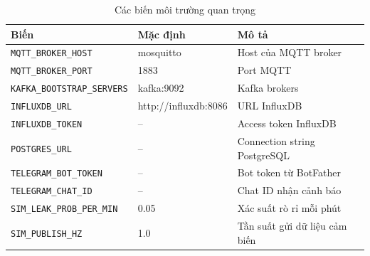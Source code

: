 \begin{table}[H]
\centering
\caption{Các biến môi trường quan trọng}
\begin{tabular}{lll}
\toprule
\textbf{Biến} & \textbf{Mặc định} & \textbf{Mô tả} \\
\midrule
\texttt{MQTT\_BROKER\_HOST}    & mosquitto & Host của MQTT broker \\
\texttt{MQTT\_BROKER\_PORT}    & 1883      & Port MQTT \\
\texttt{KAFKA\_BOOTSTRAP\_SERVERS} & kafka:9092 & Kafka brokers \\
\texttt{INFLUXDB\_URL}         & http://influxdb:8086 & URL InfluxDB \\
\texttt{INFLUXDB\_TOKEN}       & --        & Access token InfluxDB \\
\texttt{POSTGRES\_URL}         & --        & Connection string PostgreSQL \\
\texttt{TELEGRAM\_BOT\_TOKEN}  & --        & Bot token từ BotFather \\
\texttt{TELEGRAM\_CHAT\_ID}    & --        & Chat ID nhận cảnh báo \\
\texttt{SIM\_LEAK\_PROB\_PER\_MIN} & 0.05  & Xác suất rò rỉ mỗi phút \\
\texttt{SIM\_PUBLISH\_HZ}      & 1.0       & Tần suất gửi dữ liệu cảm biến \\
\bottomrule
\end{tabular}
\end{table}
